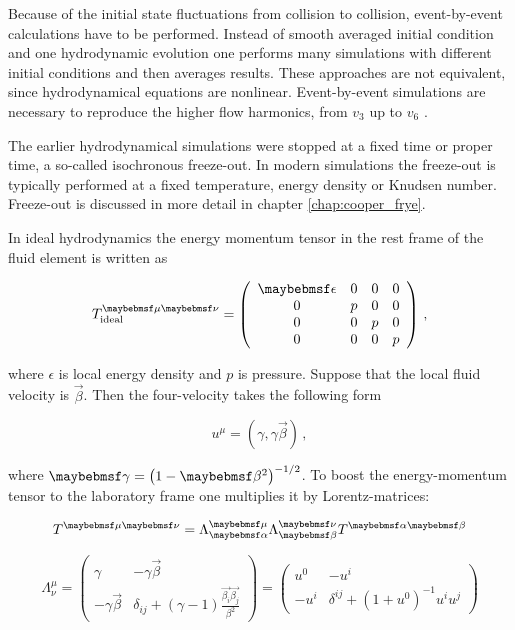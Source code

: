 Because of the initial state fluctuations from collision to collision,
event-by-event calculations have to be performed. Instead of smooth averaged initial condition and
one hydrodynamic evolution one performs many simulations with different
initial conditions and then averages results.  These approaches are not
equivalent, since hydrodynamical equations are nonlinear.  Event-by-event
simulations are necessary to reproduce the higher flow harmonics, from $v_3$ up to
$v_6$ \cite{Gardim:2011xv,Auvinen:2013sba,Noronha-Hostler:2016opk}.

The earlier hydrodynamical simulations were stopped at a fixed time or proper
time, a so-called isochronous freeze-out. In modern simulations the freeze-out is
typically performed at a fixed temperature, energy density or Knudsen number.
Freeze-out is discussed in more detail in chapter \ref{chap:cooper_frye}.

In ideal hydrodynamics the energy momentum tensor in the rest frame of the fluid
element is written as

\begin{equation} \label{eq:id_fl_tmn_rest_frame}
    \Tmn_{\mathrm{ideal}} = \left(
    \begin{array}{cccc}
           \epsilon & 0 & 0 & 0 \\
           0        & p & 0 & 0 \\
           0        & 0 & p & 0 \\
           0        & 0 & 0 & p
    \end{array} \right) \,,
\end{equation}

where $\epsilon$ is local energy density and $p$ is pressure. Suppose that
the local fluid velocity is $\vec{\beta}$. Then the four-velocity takes the following form

\begin{equation}
  u^{\mu} = (\gamma, \gamma \vec{\beta}) \,,
\end{equation}

where $\gamma = \parenths{1 - \beta^2}^{-1/2}$. To boost the energy-momentum
tensor to the laboratory frame one multiplies it by Lorentz-matrices:

\begin{equation}
  \Tmn = \Lambda^{\mu}_{\alpha} \Lambda^{\nu}_{\beta} T^{\alpha \beta}
\end{equation}

\begin{equation} \label{eq:lorentz_boost_matr}
  \Lambda^{\mu}_{\nu} = \left(
    \begin{array}{cc}
           \gamma              & -\gamma \vec{\beta} \\
           -\gamma \vec{\beta} & \delta_{ij} + (\gamma - 1) \frac{\vec{\beta_i} \vec{\beta_j}}{\beta^2}
    \end{array} \right) = \left(
    \begin{array}{cc}
           u^0  &   -u^i  \\
           -u^i &  \delta^{ij} + (1+u^0)^{-1} u^i u^j
    \end{array} \right)
\end{equation}

